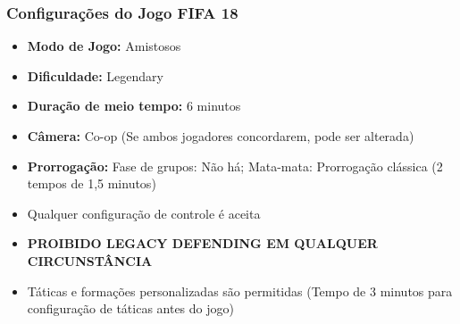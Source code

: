 \subsubsection{Configurações do Jogo FIFA 18}

\begin{itemize}
    \item \textbf{Modo de Jogo:} Amistosos
    \item \textbf{Dificuldade:} Legendary
    \item \textbf{Duração de meio tempo:} 6 minutos
    \item \textbf{Câmera:} Co-op (Se ambos jogadores concordarem, pode ser alterada)
    \item \textbf{Prorrogação:} Fase de grupos: Não há; Mata-mata: Prorrogação clássica (2 tempos de 1,5 minutos)
    \item Qualquer configuração de controle é aceita
    \item \textbf{PROIBIDO LEGACY DEFENDING EM QUALQUER CIRCUNSTÂNCIA}
    \item Táticas e formações personalizadas são permitidas (Tempo de 3 minutos para configuração de táticas antes do jogo)
\end{itemize}